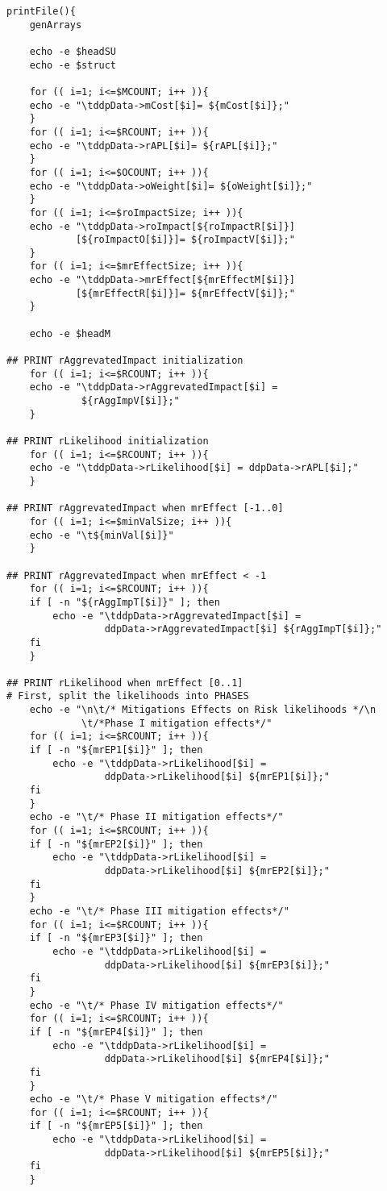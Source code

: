 \begin{tiny}
\begin{verbatim}
printFile(){
    genArrays

    echo -e $headSU
    echo -e $struct

    for (( i=1; i<=$MCOUNT; i++ )){
	echo -e "\tddpData->mCost[$i]= ${mCost[$i]};"
    }
    for (( i=1; i<=$RCOUNT; i++ )){
	echo -e "\tddpData->rAPL[$i]= ${rAPL[$i]};"
    }
    for (( i=1; i<=$OCOUNT; i++ )){
	echo -e "\tddpData->oWeight[$i]= ${oWeight[$i]};"
    }
    for (( i=1; i<=$roImpactSize; i++ )){
	echo -e "\tddpData->roImpact[${roImpactR[$i]}]
	        [${roImpactO[$i]}]= ${roImpactV[$i]};"
    }
    for (( i=1; i<=$mrEffectSize; i++ )){
	echo -e "\tddpData->mrEffect[${mrEffectM[$i]}]
	        [${mrEffectR[$i]}]= ${mrEffectV[$i]};"
    }

    echo -e $headM

## PRINT rAggrevatedImpact initialization
    for (( i=1; i<=$RCOUNT; i++ )){
	echo -e "\tddpData->rAggrevatedImpact[$i] =
	         ${rAggImpV[$i]};"
    }

## PRINT rLikelihood initialization
    for (( i=1; i<=$RCOUNT; i++ )){
	echo -e "\tddpData->rLikelihood[$i] = ddpData->rAPL[$i];"
    }

## PRINT rAggrevatedImpact when mrEffect [-1..0]
    for (( i=1; i<=$minValSize; i++ )){
	echo -e "\t${minVal[$i]}"
    }

## PRINT rAggrevatedImpact when mrEffect < -1
    for (( i=1; i<=$RCOUNT; i++ )){
	if [ -n "${rAggImpT[$i]}" ]; then
	    echo -e "\tddpData->rAggrevatedImpact[$i] =
	             ddpData->rAggrevatedImpact[$i] ${rAggImpT[$i]};"
	fi
    }

## PRINT rLikelihood when mrEffect [0..1]
# First, split the likelihoods into PHASES
    echo -e "\n\t/* Mitigations Effects on Risk likelihoods */\n
             \t/*Phase I mitigation effects*/"
    for (( i=1; i<=$RCOUNT; i++ )){
	if [ -n "${mrEP1[$i]}" ]; then
	    echo -e "\tddpData->rLikelihood[$i] =
	             ddpData->rLikelihood[$i] ${mrEP1[$i]};"
	fi
    }
    echo -e "\t/* Phase II mitigation effects*/"
    for (( i=1; i<=$RCOUNT; i++ )){
	if [ -n "${mrEP2[$i]}" ]; then
	    echo -e "\tddpData->rLikelihood[$i] =
	             ddpData->rLikelihood[$i] ${mrEP2[$i]};"
	fi
    }
    echo -e "\t/* Phase III mitigation effects*/"
    for (( i=1; i<=$RCOUNT; i++ )){
	if [ -n "${mrEP3[$i]}" ]; then
	    echo -e "\tddpData->rLikelihood[$i] =
	             ddpData->rLikelihood[$i] ${mrEP3[$i]};"
	fi
    }
    echo -e "\t/* Phase IV mitigation effects*/"
    for (( i=1; i<=$RCOUNT; i++ )){
	if [ -n "${mrEP4[$i]}" ]; then
	    echo -e "\tddpData->rLikelihood[$i] =
	             ddpData->rLikelihood[$i] ${mrEP4[$i]};"
	fi
    }
    echo -e "\t/* Phase V mitigation effects*/"
    for (( i=1; i<=$RCOUNT; i++ )){
	if [ -n "${mrEP5[$i]}" ]; then
	    echo -e "\tddpData->rLikelihood[$i] =
	             ddpData->rLikelihood[$i] ${mrEP5[$i]};"
	fi
    }


\end{verbatim}
\end{tiny}
